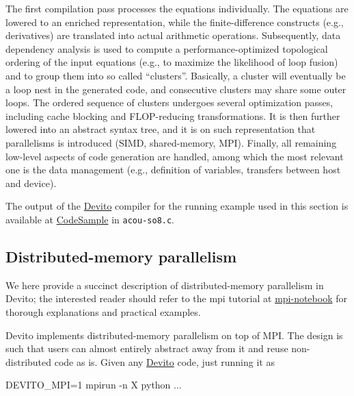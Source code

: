 \documentclass[conference]{IEEEtran}
\newenvironment{Shaded}{}{}
\newcommand{\DecValTok}[1]{\textcolor[rgb]{0.25,0.63,0.44}{{#1}}}
\newcommand{\NormalTok}[1]{{#1}}
\begin{document}
The first compilation pass processes the equations individually. The
equations are lowered to an enriched representation, while the
finite-difference constructs (e.g., derivatives) are translated into
actual arithmetic operations. Subsequently, data dependency analysis is
used to compute a performance-optimized topological ordering of the
input equations (e.g., to maximize the likelihood of loop fusion) and to
group them into so called ``clusters''. Basically, a cluster will
eventually be a loop nest in the generated code, and consecutive
clusters may share some outer loops. The ordered sequence of clusters
undergoes several optimization passes, including cache blocking and
FLOP-reducing transformations. It is then further lowered into an
abstract syntax tree, and it is on such representation that parallelisms
is introduced (SIMD, shared-memory, MPI). Finally, all remaining
low-level aspects of code generation are handled, among which the most
relevant one is the data management (e.g., definition of variables,
transfers between host and device).

The output of the \href{https://github.com/devitocodes/devito}{Devito}
compiler for the running example used in this section is available at
\href{https://github.com/mloubout/SC20Paper/tree/master/gencode}{CodeSample}
in \texttt{acou-so8.c}.

\subsection{Distributed-memory
parallelism}\label{distributed-memory-parallelism}

We here provide a succinct description of distributed-memory parallelism
in Devito; the interested reader should refer to the mpi tutorial at
\href{https://github.com/devitocodes/devito/blob/master/examples/mpi/overview.ipynb}{mpi-notebook}
for thorough explanations and practical examples.

Devito implements distributed-memory parallelism on top of MPI. The
design is such that users can almost entirely abstract away from it and
reuse non-distributed code as is. Given any
\href{https://github.com/devitocodes/devito}{Devito} code, just running
it as

\begin{Shaded}
\begin{Highlighting}[]
\NormalTok{DEVITO_MPI=}\DecValTok{1} \NormalTok{mpirun -n X python ...}
\end{Highlighting}
\end{Shaded}
\end{document}
